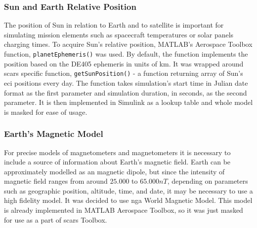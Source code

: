     \subsubsection{Sun and Earth Relative Position}
        The position of Sun in relation to Earth and to satellite is important for simulating mission elements such as spacecraft temperatures or solar panels charging times. To acquire Sun's relative position, MATLAB's Aerospace Toolbox function, \verb|planetEphemeris()| was used. By default, the function implements the position based on the DE405 ephemeris in units of km. It was wrapped around \ac{scars} specific function, \verb|getSunPosition()| - a function returning array of Sun's \ac{eci} positions every day. The function takes simulation's start time in Julian date format as the first parameter and simulation duration, in seconds, as the second parameter. It is then implemented in Simulink as a lookup table and whole model is masked for ease of usage.

    \subsubsection{Earth's Magnetic Model}
        For precise models of magnetometers and magnetometers it is necessary to include a source of information about Earth's magnetic field. Earth can be approximately modelled as an magnetic dipole, but since the intensity of magnetic field ranges from around $25.000$ to $65.000 nT$, depending on parameters such as geographic position, altitude, time, and date, it may be necessary to use a high fidelity model. It was decided to use \ac{nga} World Magnetic Model. This model is already implemented in MATLAB Aerospace Toolbox, so it was just masked for use as a part of \ac{scars} Toolbox.
 